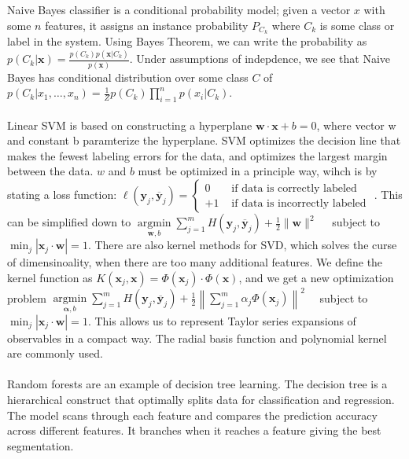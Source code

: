 \documentclass{article}
\begin{document}
Naive Bayes classifier is a conditional probability model; given a vector $x$ with some $n$ features, it assigns an instance probability $P_{C_k}$ where $C_k$ is some class or label in the system. 	Using Bayes Theorem, we can write the probability as $p\left(C_{k} | \mathbf{x}\right)=\frac{p\left(C_{k}\right) p(\mathbf{x} | C_{k})}{p(\mathbf{x})}$. Under assumptions of indepdence, we see that Naive Bayes has conditional distribution over some class $C$ of $p\left(C_{k} | x_{1}, \ldots, x_{n}\right)=\frac{1}{Z} p\left(C_{k}\right) \prod_{i=1}^{n} p\left(x_{i} | C_{k}\right)$. \\ \\
Linear SVM is based on constructing a hyperplane $\mathbf{w} \cdot \mathbf{x}+b=0$, where vector w and constant b paramterize the hyperplane. SVM optimizes the decision line that makes the fewest labeling errors for the data, and optimizes the largest margin between the data. $w$ and $b$ must be optimized in a principle way, wihch is by stating a loss function:	$\ell\left(\mathbf{y}_{j}, \overline{\mathbf{y}}_{j}\right)=\left\{\begin{aligned} 0 & \text { if data is correctly labeled } \\+1 & \text { if data is incorrectly labeled } \end{aligned}\right.$. This can be simplified down to $\underset{\mathbf{w}, b}{\operatorname{argmin}} \sum_{j=1}^{m} H\left(\mathbf{y}_{j}, \overline{\mathbf{y}}_{j}\right)+\frac{1}{2}\|\mathbf{w}\|^{2} \quad$ subject to $\min _{j}\left|\mathbf{x}_{j} \cdot \mathbf{w}\right|=1$. There are also kernel methods for SVD, which solves the curse of dimensinoality, when there are too many additional features. We define the kernel function as $K\left(\mathbf{x}_{j}, \mathbf{x}\right)=\Phi\left(\mathbf{x}_{j}\right) \cdot \Phi(\mathbf{x})$, and we get a new optimization problem $\underset{\boldsymbol{\alpha}, b}{\operatorname{argmin}} \sum_{j=1}^{m} H\left(\mathbf{y}_{j}, \overline{\mathbf{y}}_{j}\right)+\frac{1}{2}\left\|\sum_{j=1}^{m} \alpha_{j} \Phi\left(\mathbf{x}_{j}\right)\right\|^{2} \quad$ subject to $\min _{j}\left|\mathbf{x}_{j} \cdot \mathbf{w}\right|=1$. This allows us to represent Taylor series expansions of observables in a compact way. The radial basis function and polynomial kernel are commonly used. \\ \\
Random forests are an example of decision tree learning. The decision tree is a hierarchical construct that optimally splits data for classification and regression. The model scans through each feature and compares the prediction accuracy across different features. It branches when it reaches a feature giving the best segmentation.
\end{document}
